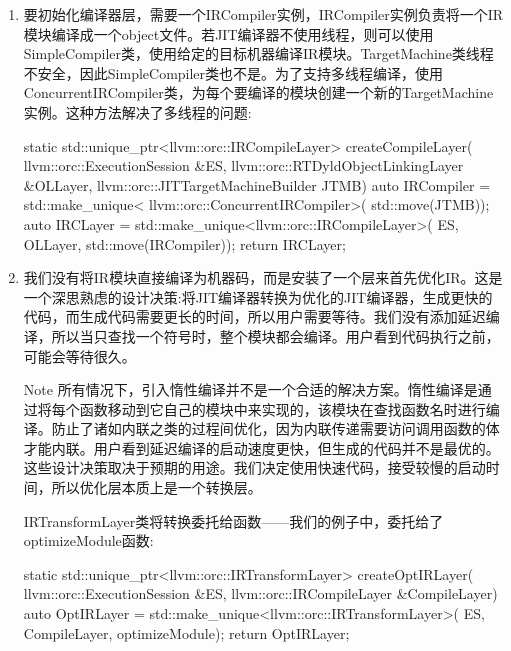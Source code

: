 \begin{enumerate}
\begin{cpp}
   if (JTMB.getTargetTriple().isOSBinFormatCOFF()) {
       OLLayer
            ->setOverrideObjectFlagsWithResponsibilityFlags(
                true);
       OLLayer
            ->setAutoClaimResponsibilityForObjectSymbols(
                true);
   }
   return OLLayer;
}
\end{cpp}

\item
要初始化编译器层，需要一个IRCompiler实例，IRCompiler实例负责将一个IR模块编译成一个object文件。若JIT编译器不使用线程，则可以使用SimpleCompiler类，使用给定的目标机器编译IR模块。TargetMachine类线程不安全，因此SimpleCompiler类也不是。为了支持多线程编译，使用ConcurrentIRCompiler类，为每个要编译的模块创建一个新的TargetMachine实例。这种方法解决了多线程的问题:

\begin{cpp}
    static std::unique_ptr<llvm::orc::IRCompileLayer>
    createCompileLayer(
            llvm::orc::ExecutionSession &ES,
            llvm::orc::RTDyldObjectLinkingLayer &OLLayer,
            llvm::orc::JITTargetMachineBuilder JTMB) {
        auto IRCompiler = std::make_unique<
            llvm::orc::ConcurrentIRCompiler>(
            std::move(JTMB));
        auto IRCLayer =
            std::make_unique<llvm::orc::IRCompileLayer>(
                ES, OLLayer, std::move(IRCompiler));
        return IRCLayer;
    }
\end{cpp}

\item
我们没有将IR模块直接编译为机器码，而是安装了一个层来首先优化IR。这是一个深思熟虑的设计决策:将JIT编译器转换为优化的JIT编译器，生成更快的代码，而生成代码需要更长的时间，所以用户需要等待。我们没有添加延迟编译，所以当只查找一个符号时，整个模块都会编译。用户看到代码执行之前，可能会等待很久。

\begin{myNotic}{Note}
所有情况下，引入惰性编译并不是一个合适的解决方案。惰性编译是通过将每个函数移动到它自己的模块中来实现的，该模块在查找函数名时进行编译。防止了诸如内联之类的过程间优化，因为内联传递需要访问调用函数的体才能内联。用户看到延迟编译的启动速度更快，但生成的代码并不是最优的。这些设计决策取决于预期的用途。我们决定使用快速代码，接受较慢的启动时间，所以优化层本质上是一个转换层。
\end{myNotic}

IRTransformLayer类将转换委托给函数——我们的例子中，委托给了optimizeModule函数:

\begin{cpp}
    static std::unique_ptr<llvm::orc::IRTransformLayer>
    createOptIRLayer(
            llvm::orc::ExecutionSession &ES,
            llvm::orc::IRCompileLayer &CompileLayer) {
        auto OptIRLayer =
        std::make_unique<llvm::orc::IRTransformLayer>(
            ES, CompileLayer,
            optimizeModule);
        return OptIRLayer;
    }
\end{cpp}


\end{enumerate}
